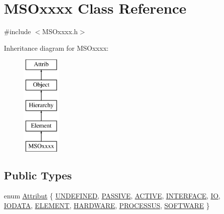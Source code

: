 \hypertarget{classMSOxxxx}{}\section{M\+S\+Oxxxx Class Reference}
\label{classMSOxxxx}


{\ttfamily \#include $<$M\+S\+Oxxxx.\+h$>$}

Inheritance diagram for M\+S\+Oxxxx\+:\begin{figure}[H]
\begin{center}
\leavevmode
\includegraphics[height=5.000000cm]{classMSOxxxx}
\end{center}
\end{figure}
\subsection*{Public Types}
\begin{DoxyCompactItemize}
\item 
enum \hyperlink{classAttrib_a69e171d7cc6417835a5a306d3c764235}{Attribut} \{ \newline
\hyperlink{classAttrib_a69e171d7cc6417835a5a306d3c764235a3a8da2ab97dda18aebab196fe4100531}{U\+N\+D\+E\+F\+I\+N\+ED}, 
\hyperlink{classAttrib_a69e171d7cc6417835a5a306d3c764235a2bfb2af57b87031d190a05fe25dd92ed}{P\+A\+S\+S\+I\+VE}, 
\hyperlink{classAttrib_a69e171d7cc6417835a5a306d3c764235a3b1fec929c0370d1436f2f06e298fb0d}{A\+C\+T\+I\+VE}, 
\hyperlink{classAttrib_a69e171d7cc6417835a5a306d3c764235aa27c16b480a369ea4d18b07b2516bbc7}{I\+N\+T\+E\+R\+F\+A\+CE}, 
\newline
\hyperlink{classAttrib_a69e171d7cc6417835a5a306d3c764235a1420a5b8c0540b2af210b6975eded7f9}{IO}, 
\hyperlink{classAttrib_a69e171d7cc6417835a5a306d3c764235a0af3b0d0ac323c1704e6c69cf90add28}{I\+O\+D\+A\+TA}, 
\hyperlink{classAttrib_a69e171d7cc6417835a5a306d3c764235a7788bc5dd333fd8ce18562b269c9dab1}{E\+L\+E\+M\+E\+NT}, 
\hyperlink{classAttrib_a69e171d7cc6417835a5a306d3c764235a61ceb22149f365f1780d18f9d1459423}{H\+A\+R\+D\+W\+A\+RE}, 
\newline
\hyperlink{classAttrib_a69e171d7cc6417835a5a306d3c764235a75250e29692496e73effca2c0330977f}{P\+R\+O\+C\+E\+S\+S\+US}, 
\hyperlink{classAttrib_a69e171d7cc6417835a5a306d3c764235a103a67cd0b8f07ef478fa45d4356e27b}{S\+O\+F\+T\+W\+A\+RE}
 \}
\end{DoxyCompactItemize}
